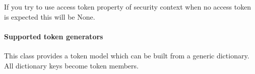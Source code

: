\documentclass[letterpaper,10pt,english]{sphinxmanual}
\begin{document}
If you try to use access token property of security context when no access token is expected this will be None.


\paragraph{Supported token generators}
\label{features/oauth2/technical_summary:supported-token-generators}

\begin{fulllineitems}
\label{features/oauth2/technical_summary:fantastico.oauth2.token.Token}
This class provides a token model which can be built from a generic dictionary. All dictionary keys become token
members.

\end{fulllineitems}

\end{document}
